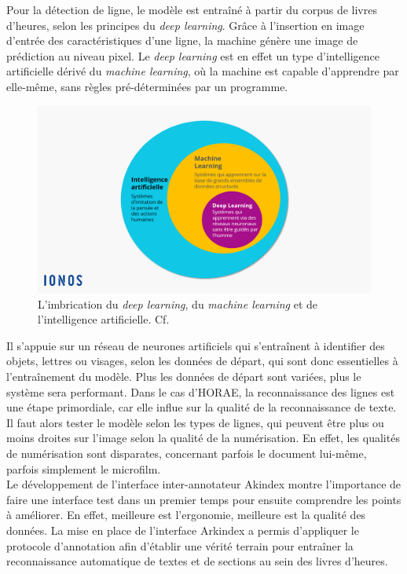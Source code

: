\documentclass[a4paper,12pt,twoside]{book}
\begin{document}
Pour la détection de ligne, le modèle est entraîné à partir du corpus de livres d'heures, selon les principes du \textit{deep learning}. Grâce à l'insertion en image d’entrée des caractéristiques d’une ligne, la machine génère une image de prédiction au niveau pixel. Le \textit{deep learning} est en effet un type d'intelligence artificielle dérivé du \textit{machine learning}, où la machine est capable d'apprendre par elle-même, sans règles pré-déterminées par un programme. 
	\begin{figure}[!h]
    \centering
    \includegraphics[width=13cm]{img/ML/schema_deep_learning.png}
    \caption{L'imbrication du \textit{deep learning}, du \textit{machine learning} et de l'intelligence artificielle. Cf. \cite{Difference_deeplearning_machinelearning}}
    \end{figure}
Il s'appuie sur un réseau de neurones artificiels qui s'entraînent à identifier des objets, lettres ou visages, selon les données de départ, qui sont donc essentielles à l'entraînement du modèle. Plus les données de départ sont variées, plus le système sera performant. Dans le cas d'HORAE, la reconnaissance des lignes est une étape primordiale, car elle influe sur la qualité de la reconnaissance de texte. Il faut alors tester le modèle selon les types de lignes, qui peuvent 
être plus ou moins droites sur l'image selon la qualité de la numérisation. En effet, les qualités de numérisation sont disparates, concernant parfois le document lui-même, parfois simplement le microfilm. \\

 Le développement de l'interface inter-annotateur Akindex montre l'importance de faire une interface test dans un premier temps pour ensuite comprendre les points à améliorer. En effet, meilleure est l'ergonomie, meilleure est la qualité des données. La mise en place de l'interface Arkindex a permis d'appliquer le protocole d'annotation afin d’établir une vérité terrain pour entraîner la reconnaissance automatique de textes et de sections au sein des livres d'heures. 
\end{document}
